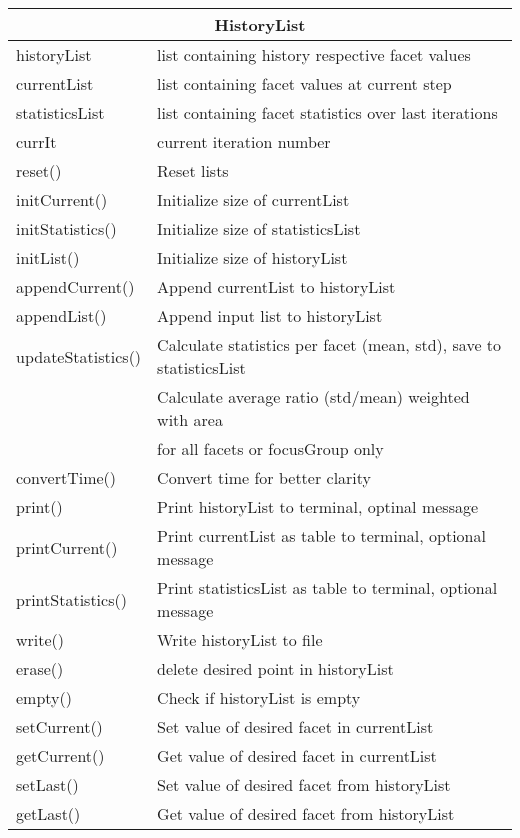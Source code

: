 \begin{center}
\begin{tabular}{|l|l|}
\hline
\multicolumn{2}{|c|}{\rule{0pt}{3ex}HistoryList}\\
\hline
\rule{0pt}{3ex} historyList& list containing history respective facet values\\
\rule{0pt}{3ex} currentList& list containing facet values at current step\\
\rule{0pt}{3ex} statisticsList& list containing facet statistics over last iterations\\
\rule{0pt}{3ex} currIt& current iteration number\\
\hline
\rule{0pt}{3ex} reset()& Reset lists\\
\rule{0pt}{3ex} initCurrent()& Initialize size of currentList\\
\rule{0pt}{3ex} initStatistics()& Initialize size of statisticsList\\
\rule{0pt}{3ex} initList()& Initialize size of historyList\\
\rule{0pt}{3ex} appendCurrent()& Append currentList to historyList\\
\rule{0pt}{3ex} appendList()& Append input list to historyList\\
\rule{0pt}{3ex} updateStatistics()& Calculate statistics per facet (mean, std), save to statisticsList\\
\rule{0pt}{3ex} \multirow{2}{*}{getAverageStatistics()}& Calculate average ratio (std/mean) weighted with area\\ & for all facets or focusGroup only\\
\rule{0pt}{3ex} convertTime()& Convert time for better clarity\\
\rule{0pt}{3ex} print()& Print historyList to terminal, optinal message\\
\rule{0pt}{3ex} printCurrent()& Print currentList as table to terminal, optional message\\
\rule{0pt}{3ex} printStatistics()& Print statisticsList as table to terminal, optional message\\
\rule{0pt}{3ex} write()& Write historyList to file\\
\rule{0pt}{3ex} erase()& delete desired point in historyList\\
\rule{0pt}{3ex} empty()& Check if historyList is empty\\
\rule{0pt}{3ex} setCurrent()& Set value of desired facet in currentList\\
\rule{0pt}{3ex} getCurrent()& Get value of desired facet in currentList\\
\rule{0pt}{3ex} setLast()& Set value of desired facet from historyList\\
\rule{0pt}{3ex} getLast()& Get value of desired facet from historyList\\
\hline
\end{tabular}
\end{center}


